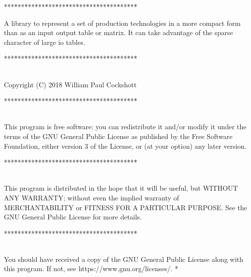 \begin{tabbing}
***\=***\=***\=***\=***\=***\=***\=***\=***\=***\=***\=***\=***\=\kill
\end{tabbing}
A library to represent a set of production technologies in a more compact
form than as an input output table or matrix. It can take advantage
of the sparse character of large io tables.
\begin{tabbing}
***\=***\=***\=***\=***\=***\=***\=***\=***\=***\=***\=***\=***\=\kill
\\
\\
\end{tabbing}
Copyright (C) 2018 William Paul Cockshott
\begin{tabbing}
***\=***\=***\=***\=***\=***\=***\=***\=***\=***\=***\=***\=***\=\kill
\\
\\
\end{tabbing}
This program is free software: you can redistribute it and/or modify
it under the terms of the GNU General Public License as published by
the Free Software Foundation, either version 3 of the License, or
(at your option) any later version.
\begin{tabbing}
***\=***\=***\=***\=***\=***\=***\=***\=***\=***\=***\=***\=***\=\kill
\\
\\
\end{tabbing}
This program is distributed in the hope that it will be useful,
but WITHOUT ANY WARRANTY; without even the implied warranty of
MERCHANTABILITY or FITNESS FOR A PARTICULAR PURPOSE.  See the
GNU General Public License for more details.
\begin{tabbing}
***\=***\=***\=***\=***\=***\=***\=***\=***\=***\=***\=***\=***\=\kill
\\
\\
\end{tabbing}
You should have received a copy of the GNU General Public License
along with this program.  If not, see https://www.gnu.org/licenses/.
*
